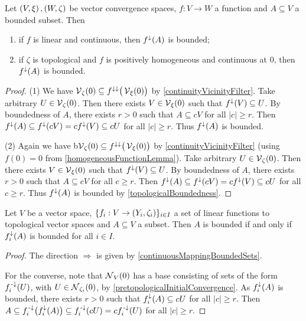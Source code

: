 \begin{proposition} \label{continuousMappingBoundedSets}
Let $\left( V,\xi \right), \left( W,\zeta \right)$ be vector convergence spaces, $f:V\to W$ a function and $A\subseteq V$ a bounded subset. Then
\begin{enumerate}
\item if $f$ is linear and continuous, then $f^\downarrow(A)$ is bounded;
\item if $\zeta$ is topological and $f$ is positively homogeneous and continuous at $0$, then $f^\downarrow(A)$ is bounded.
\end{enumerate} 
\end{proposition}
\begin{proof}
(1) We have $\operatorname{\mathcal{V}}_\zeta(0) \subseteq f^{\downarrow\downarrow}\big(\operatorname{\mathcal{V}}_\xi(0)\big)$ by \ref{continuityVicinityFilter}.
Take arbitrary $U\in \operatorname{\mathcal{V}}_\zeta(0)$. Then there exists $V\in \operatorname{\mathcal{V}}_\xi(0)$ such that $f^\downarrow(V) \subseteq U$. By boundedness of $A$, there exists $r>0$ such that $A \subseteq cV$ for all $|c|\geq r$. Then $f^\downarrow(A)\subseteq f^\downarrow(cV) = cf^\downarrow(V) \subseteq cU$ for all $|c|\geq r$. Thus $f^\downarrow(A)$ is bounded.

(2) Again we have b$\operatorname{\mathcal{V}}_\zeta(0) \subseteq f^{\downarrow\downarrow}\big(\operatorname{\mathcal{V}}_\xi(0)\big)$ by \ref{continuityVicinityFilter} (using $f(0) = 0$ from \ref{homogeneousFunctionLemma}). Take arbitrary $U\in \operatorname{\mathcal{V}}_\zeta(0)$. Then there exists $V\in \operatorname{\mathcal{V}}_\xi(0)$ such that $f^\downarrow(V) \subseteq U$. By boundedness of $A$, there exists $r>0$ such that $A \subseteq cV$ for all $c\geq r$. Then $f^\downarrow(A)\subseteq f^\downarrow(cV) = cf^\downarrow(V) \subseteq cU$ for all $c\geq r$. Thus $f^\downarrow(A)$ is bounded by \ref{topologicalBoundedness}.
\end{proof}

\begin{proposition} \label{boundedSetsInitialTopology}
Let $V$ be a vector space, $\{f_i:V\to \left( Y_i,\zeta_i \right)\}_{i\in I}$ a set of linear functions to topological vector spaces and $A\subseteq V$ a subset. Then $A$ is bounded \textup{if and only if} $f_{i}^{\downarrow}(A)$ is bounded for all $i\in I$.
\end{proposition}
\begin{proof}
The direction $\Rightarrow$ is given by \ref{continuousMappingBoundedSets}.

For the converse, note that $\operatorname{\mathcal{N}}_V(0)$ has a base consisting of sets of the form $f^{{\text{\hspace{0.15em}-}\downarrow}}_i(U)$, with $U\in \operatorname{\mathcal{N}}_{\zeta_i}(0)$, by \ref{pretopologicalInitialConvergence}.
As $f_{i}^{\downarrow}(A)$ is bounded, there exists $r>0$ such that $f_{i}^{\downarrow}(A) \subseteq cU$ for all $|c|\geq r$. Then $A \subseteq f_i^{{\text{\hspace{0.15em}-}\downarrow}}\big(f_i^\downarrow(A)\big) \subseteq f_i^{\text{\hspace{0.15em}-}\downarrow}(cU) = cf_i^{\text{\hspace{0.15em}-}\downarrow}(U)$ for all $|c|\geq r$.
\end{proof}

